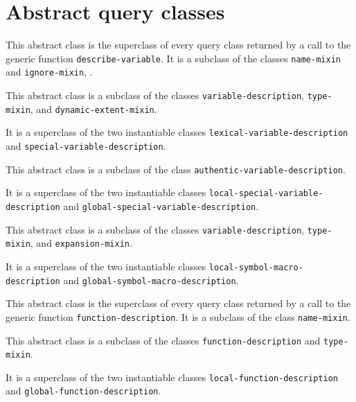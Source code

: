 \section{Abstract query classes}

{\footnotesize
{}
}

This abstract class is the superclass of every query class returned by
a call to the generic function \texttt{describe-variable}.  It is a
subclass of the classes \texttt{name-mixin} and \texttt{ignore-mixin}, .

{\footnotesize
{}
}

This abstract class is a subclass of the classes
\texttt{variable-description}, \texttt{type-mixin}, and
\texttt{dynamic-extent-mixin}.

It is a superclass of the two instantiable classes
\texttt{lexical-variable-description} and
\texttt{special-variable-description}.

{\footnotesize
{}
}

This abstract class is a subclass of the class
\texttt{authentic-variable-description}.

It is a superclass of the two instantiable classes
\texttt{local-special-variable-description} and
\texttt{global-special-variable-description}.

{\footnotesize
{}
}

This abstract class is a subclass of the classes
\texttt{variable-description}, \texttt{type-mixin}, and
\texttt{expansion-mixin}.

It is a superclass of the two instantiable classes
\texttt{local-symbol-macro-description} and
\texttt{global-symbol-macro-description}.

{\footnotesize
{}
}

This abstract class is the superclass of every query class returned by
a call to the generic function \texttt{function-description}.  It is a
subclass of the class \texttt{name-mixin}.

{\footnotesize
{}
}

This abstract class is a subclass of the classes
\texttt{function-description} and \texttt{type-mixin}.

It is a superclass of the two instantiable classes
\texttt{local-function-description} and
\texttt{global-function-description}.

